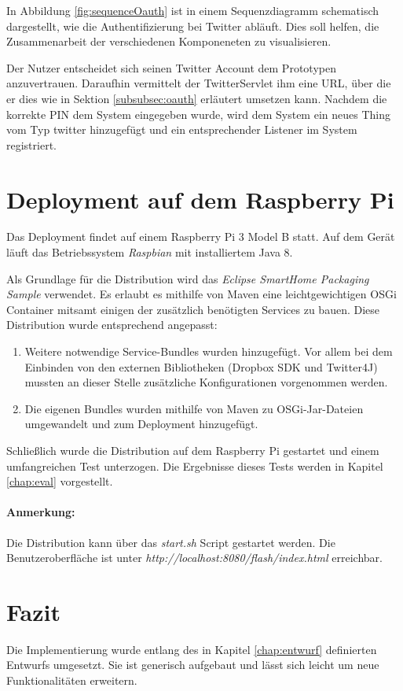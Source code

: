 In Abbildung \ref{fig:sequenceOauth} ist in einem Sequenzdiagramm schematisch dargestellt, wie die Authentifizierung bei Twitter abläuft. Dies soll helfen, die Zusammenarbeit der verschiedenen Komponeneten zu visualisieren.

Der Nutzer entscheidet sich seinen Twitter Account dem Prototypen anzuvertrauen. Daraufhin vermittelt der TwitterServlet ihm eine URL, über die er dies wie in Sektion \ref{subsubsec:oauth} erläutert umsetzen kann. Nachdem die korrekte PIN dem System eingegeben wurde, wird dem System ein neues Thing vom Typ \glqq twitter\grqq{} hinzugefügt und ein entsprechender Listener im System registriert.


\section{Deployment auf dem Raspberry Pi}
\label{impl:deployment}
Das Deployment findet auf einem Raspberry Pi 3 Model B statt. Auf dem Gerät läuft das Betriebssystem \textit{Raspbian} mit installiertem Java 8.

Als Grundlage für die Distribution wird das \textit{Eclipse SmartHome Packaging Sample}\cite{eshsample} verwendet. Es erlaubt es mithilfe von Maven\cite{maven} eine leichtgewichtigen OSGi Container mitsamt einigen der zusätzlich benötigten Services zu bauen. Diese Distribution wurde entsprechend angepasst: 
\begin{enumerate}
\item Weitere notwendige Service-Bundles wurden hinzugefügt. Vor allem bei dem Einbinden von den externen Bibliotheken (Dropbox SDK und Twitter4J) mussten an dieser Stelle zusätzliche Konfigurationen vorgenommen werden.
\item Die eigenen Bundles wurden mithilfe von Maven zu OSGi-Jar-Dateien umgewandelt und zum Deployment hinzugefügt.
\end{enumerate}

Schließlich wurde die Distribution auf dem Raspberry Pi gestartet und einem umfangreichen Test unterzogen. Die Ergebnisse dieses Tests werden in Kapitel \ref{chap:eval} vorgestellt.

\paragraph{Anmerkung:} Die Distribution kann über das \textit{start.sh} Script gestartet werden. Die Benutzeroberfläche ist unter \textit{http://localhost:8080/flash/index.html} erreichbar.

\section{Fazit}
Die Implementierung wurde entlang des in Kapitel \ref{chap:entwurf} definierten Entwurfs umgesetzt. Sie ist generisch aufgebaut und lässt sich leicht um neue Funktionalitäten erweitern.

